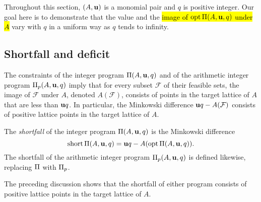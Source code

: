 \documentclass{amsart}
\begin{document}
Throughout this section, $(A, \mathbf{u})$ is a monomial pair and $q$ is positive integer.
Our goal here is to demonstrate that the value and the \hl{image of $\operatorname{opt}\Pi(A, \mathbf{u}, q)$ under $A$}
vary with $q$ in a uniform way as $q$ tends to infinity.

\subsection{Shortfall and deficit}

The constraints of the integer program $\Pi(A,\mathbf{u},q)$ and of the arithmetic integer program $\Pi_p(A,\mathbf{u},q)$ imply that for every subset $\mathcal{F}$ of their feasible sets, the image of $\mathcal{F}$ under $A$, denoted $A(\mathcal{F})$, consists of points in the target lattice of $A$ that are less than $\mathbf{u}q$.
In particular, the Minkowski difference $\mathbf{u}q-A(\mathcal{F})$ consists of positive lattice points in the target lattice of $A$.

\begin{definition}
   The \emph{shortfall} of the integer program $\Pi(A, \mathbf{u}, q)$ is the Minkowski difference
   \[ \operatorname{short} \Pi(A, \mathbf{u}, q) = \mathbf{u}q - A( \operatorname{opt} \Pi(A, \mathbf{u}, q)).\]
   The shortfall of the arithmetic integer program $\Pi_p(A, \mathbf{u}, q)$ is defined likewise, replacing $\Pi$ with $\Pi_p$.
\end{definition}

The preceding discussion shows that the shortfall of either program consists of positive lattice points in the target lattice of $A$.
\end{document}
